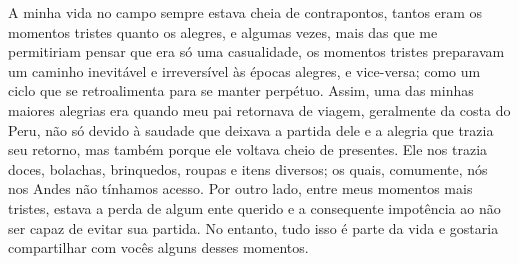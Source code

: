 A minha vida no campo sempre estava cheia de contrapontos, tantos eram os momentos tristes quanto os alegres, e algumas vezes, mais das que me permitiriam pensar que era só uma casualidade, os momentos tristes preparavam um caminho inevitável e irreversível às épocas alegres, e vice-versa; como um ciclo que se retroalimenta para se manter perpétuo. 
Assim, uma das minhas maiores alegrias era quando meu pai retornava de viagem, geralmente da costa do Peru, não só devido à saudade que deixava a partida dele e a alegria que trazia seu retorno, mas também porque ele voltava cheio de presentes. Ele nos trazia doces, bolachas, brinquedos, roupas e itens diversos; os quais, comumente, nós nos Andes não tínhamos acesso.
Por outro lado, entre meus momentos mais tristes, estava a perda de algum ente querido e a consequente impotência ao não ser capaz de evitar sua partida. 
No entanto, tudo isso é parte da vida e gostaria compartilhar com vocês alguns desses momentos.



